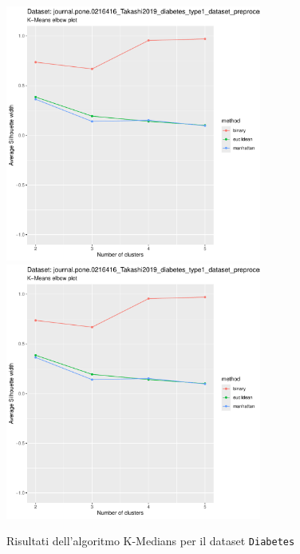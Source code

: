 \documentclass[a4paper, 12pt]{report}
\begin{document}
			\begin{figure}[H]
				\centering
				\includegraphics[width = 0.75\textwidth, height = 0.45\textheight, page = 3]{
					results/results_Diabetes.csv.pdf
				}
				\includegraphics[width = 0.75\textwidth, height = 0.45\textheight, page = 4]{
					results/results_Diabetes.csv.pdf
				}
				\caption{Risultati dell'algoritmo K-Medians per il dataset
				\texttt{Diabetes}}
				\label{fig:kmedians4}
			\end{figure}
\end{document}
